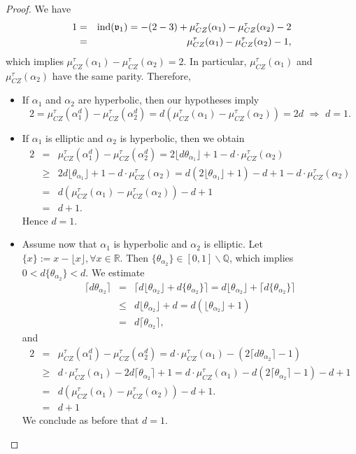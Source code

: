 \documentclass{amsart}
\newcommand{\R}{\mathbb{R}}
\newcommand{\Q}{\mathbb{Q}}
\newcommand{\CZ}{\mu_{CZ}^{\tau}}
\newcommand{\ind}{\textnormal{ind}}
\begin{document}
\begin{proof}
We have
\begin{eqnarray*}
1&=&\ind(\mathfrak{v}_1)=-(2-3)+\CZ(\alpha_1)-\CZ(\alpha_2)-2\\
&=& \CZ(\alpha_1)-\CZ(\alpha_2)-1,
\end{eqnarray*}
which implies
$\CZ(\alpha_1)-\CZ(\alpha_2)=2.$
In particular, $\CZ(\alpha_1)$ and $\CZ(\alpha_2)$ have the same parity. Therefore,
\begin{itemize}
    \item If $\alpha_1$ and $\alpha_2$ are hyperbolic, then our hypotheses imply
     $$2=\CZ(\alpha_1^d)-\CZ(\alpha_2^d)=d(\CZ(\alpha_1)-\CZ(\alpha_2))=2d \,\,\Rightarrow \,\, d =1.$$
     \item If $\alpha_1$ is elliptic and $\alpha_2$ is hyperbolic, then we obtain
     \begin{eqnarray*}
     2&=& \CZ(\alpha_1^d)-\CZ(\alpha_2^d)=2\lfloor d\theta_{\alpha_1}\rfloor+1 -d\cdot\CZ(\alpha_2)\\
     &\geq & 2d\lfloor \theta_{\alpha_1}\rfloor+1 -d \cdot \CZ(\alpha_2)=d(2\lfloor \theta_{\alpha_1}\rfloor+1)-d+1 -d \cdot\CZ(\alpha_2)\\
     &=&d(\CZ(\alpha_1)-\CZ(\alpha_2))-d+1\\
     &=& d+1.
     \end{eqnarray*}
     Hence  $d=1$.
     \item Assume now that $\alpha_1$ is hyperbolic and $\alpha_2$ is elliptic. Let $\{x\}:=x-\lfloor x \rfloor, \forall x\in \R$. Then $\{\theta_{\alpha_2}\} \in [0,1] \backslash \Q$, which implies $0<d\{\theta_{\alpha_2}\}<d$. We estimate
    \begin{eqnarray*}
    \lceil d\theta_{\alpha_2} \rceil &=& \big\lceil d \lfloor \theta_{\alpha_2} \rfloor + d\{\theta_{\alpha_2}\} \big\rceil = d \lfloor \theta_{\alpha_2} \rfloor + \lceil d\{\theta_{\alpha_2}\} \rceil \\
    &\leq & d \lfloor \theta_{\alpha_2} \rfloor +d = d(\lfloor \theta_{\alpha_2} \rfloor + 1) \\
    &=& d\lceil \theta_{\alpha_2}\rceil,
    \end{eqnarray*}
    and
    \begin{eqnarray*}
    2&=& \CZ(\alpha_1^d)-\CZ(\alpha_2^d)= d \cdot \CZ(\alpha_1)-(2\lceil d\theta_{\alpha_2}\rceil-1)\\
    &\geq& d \cdot \CZ(\alpha_1)-2d \lceil \theta_{\alpha_2} \rceil + 1 = d \cdot \CZ(\alpha_1)-d(2 \lceil \theta_{\alpha_2} \rceil -1)-d+1 \\
    &=& d(\CZ(\alpha_1)-\CZ(\alpha_2))-d+1. \\
    &=& d+1
    \end{eqnarray*}
    We conclude as before that $d=1$.
\end{itemize}
\end{proof}
\end{document}
